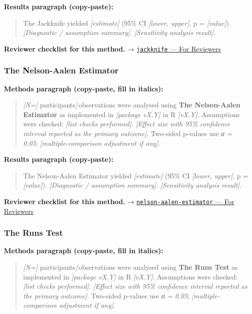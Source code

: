 \documentclass[
]{article}
\begin{document}
\textbf{Results paragraph (copy-paste):}

\begin{quote}
The Jackknife yielded \emph{{[}estimate{]}} (95\% CI \emph{{[}lower,
upper{]}}, p = \emph{{[}value{]}}). \emph{{[}Diagnostic / assumption
summary{]}}. \emph{{[}Sensitivity analysis result{]}}.
\end{quote}

\textbf{Reviewer checklist for this method.} →
\href{../chapters/04-inferential/jackknife.Rmd\#for-reviewers}{\texttt{jackknife}
--- For Reviewers}

\subsubsection{The Nelson-Aalen
Estimator}\label{the-nelson-aalen-estimator}

\textbf{Methods paragraph (copy-paste, fill in italics):}

\begin{quote}
\emph{{[}N={]}} participants/observations were analysed using
\textbf{The Nelson-Aalen Estimator} as implemented in \emph{{[}package
vX.Y{]}} in R \emph{{[}vX.Y{]}}. Assumptions were checked: \emph{{[}list
checks performed{]}}. \emph{{[}Effect size with 95\% confidence interval
reported as the primary outcome{]}}. Two-sided p-values use \emph{α =
0.05}; \emph{{[}multiple-comparison adjustment if any{]}}.
\end{quote}

\textbf{Results paragraph (copy-paste):}

\begin{quote}
The Nelson-Aalen Estimator yielded \emph{{[}estimate{]}} (95\% CI
\emph{{[}lower, upper{]}}, p = \emph{{[}value{]}}). \emph{{[}Diagnostic
/ assumption summary{]}}. \emph{{[}Sensitivity analysis result{]}}.
\end{quote}

\textbf{Reviewer checklist for this method.} →
\href{../chapters/11-survival/nelson-aalen-estimator.Rmd\#for-reviewers}{\texttt{nelson-aalen-estimator}
--- For Reviewers}

\subsubsection{The Runs Test}\label{the-runs-test}

\textbf{Methods paragraph (copy-paste, fill in italics):}

\begin{quote}
\emph{{[}N={]}} participants/observations were analysed using
\textbf{The Runs Test} as implemented in \emph{{[}package vX.Y{]}} in R
\emph{{[}vX.Y{]}}. Assumptions were checked: \emph{{[}list checks
performed{]}}. \emph{{[}Effect size with 95\% confidence interval
reported as the primary outcome{]}}. Two-sided p-values use \emph{α =
0.05}; \emph{{[}multiple-comparison adjustment if any{]}}.
\end{quote}
\end{document}
